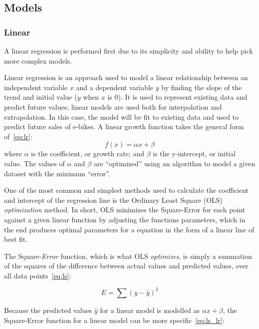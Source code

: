 \subsection{Models}

\subsubsection*{Linear}
A linear regression is performed first due to its simplicity and ability to help pick more complex models.

Linear regression is an approach used to model a linear relationship between an independent variable $x$ and a dependent variable $y$ by finding the slope of the trend and initial value ($y$ when $x$ is 0).
It is used to represent existing data and predict future values; linear models are used both for interpolation and extrapolation.
In this case, the model will be fit to existing data and used to predict future sales of e-bikes.
A linear growth function takes the general form of~\eqref{eq:lr}:
%
\begin{equation}
    f(x) = \alpha x + \beta
    \label{eq:lr}
\end{equation}
%
\noindent where $\alpha$ is the coefficient, or growth rate; and $\beta$ is the y-intercept, or initial value.
The values of $\alpha$ and $\beta$ are ``optimized'' using an algorithm to model a given dataset with the minimum ``error''.

One of the most common and simplest methods used to calculate the coefficient and intercept of the regression line is the Ordinary Least Square (OLS) \textit{optimization} method.
In short, OLS minimizes the Square-Error for each point against a given linear function by adjusting the function\textquotesingle s parameters, which in the end produces optimal parameters for a equation in the form of a linear line of best fit.

The Square-\textit{Error} function, which is what OLS \textit{optimizes}, is simply a summation of the squares of the difference between actual values and predicted values, over all data points~\eqref{eq:ls}:

\begin{equation}
    E = \sum{(y - \hat{y})^2}
    \label{eq:ls}
\end{equation}

Because the predicted values $\hat{y}$ for a linear model is modelled as $\alpha x + \beta$, the Square-Error function for a linear model can be more specific~\eqref{eq:ls_lr}:

